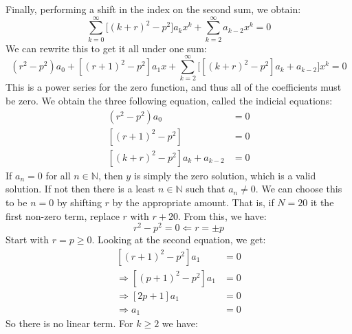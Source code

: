 \documentclass[crop=false,class=book,oneside]{standalone}
\begin{document}
        Finally, performing a shift in the index on the second
        sum, we obtain:
        \begin{equation}
            \sum_{k=0}^{\infty}\Big[(k+r)^{2}-p^{2}\Big]
                a_{k}x^{k}+
            \sum_{k=2}^{\infty}a_{k-2}x^{k}=0
        \end{equation}
        We can rewrite this to get it all under one sum:
        \begin{equation}
            (r^{2}-p^{2})a_{0}+[(r+1)^{2}-p^{2}]a_{1}x+
            \sum_{k=2}^{\infty}\Big[
                [(k+r)^{2}-p^{2}]a_{k}+a_{k-2}\Big]x^{k}=0
        \end{equation}
        This is a power series for the zero function, and thus all
        of the coefficients must be zero. We obtain the three
        following equation, called the indicial equations:
        \begin{subequations}
            \begin{align}
                (r^{2}-p^{2})a_{0}&=0\\
                [(r+1)^{2}-p^{2}]&=0\\
                [(k+r)^{2}-p^{2}]a_{k}+a_{k-2}&=0
            \end{align}
        \end{subequations}
        If $a_{n}=0$ for all $n\in\mathbb{N}$, then $y$ is simply
        the zero solution, which is a valid solution. If not then
        there is a least $n\in\mathbb{N}$ such that $a_{n}\ne{0}$.
        We can choose this to be $n=0$ by shifting $r$ by the
        appropriate amount. That is, if $N=20$ it the first non-zero
        term, replace $r$ with $r+20$. From this, we have:
        \begin{equation}
            r^{2}-p^{2}=0\Longleftarrow{r}=\pm{p}
        \end{equation}
        Start with $r=p\geq{0}$. Looking at the second equation, we
        get:
        \begin{subequations}
            \begin{align}
                [(r+1)^{2}-p^{2}]a_{1}&=0\\
                \Rightarrow[(p+1)^{2}-p^{2}]a_{1}&=0\\
                \Rightarrow[2p+1]a_{1}&=0\\
                \Rightarrow{a}_{1}&=0
            \end{align}
        \end{subequations}
        So there is no linear term. For $k\geq{2}$ we have:
\end{document}
